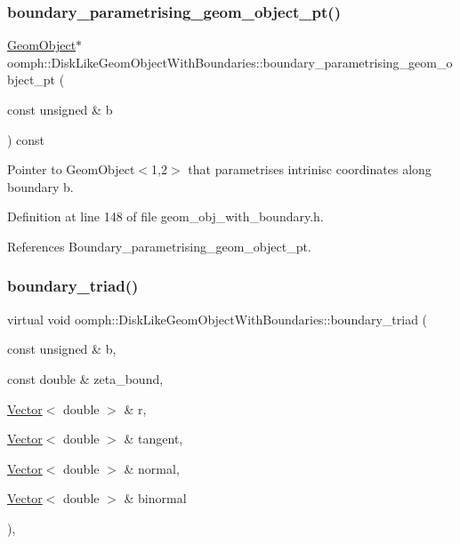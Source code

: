 \subsubsection{\texorpdfstring{boundary\+\_\+parametrising\+\_\+geom\+\_\+object\+\_\+pt()}{boundary\_parametrising\_geom\_object\_pt()}}
{\footnotesize\ttfamily \hyperlink{classoomph_1_1GeomObject}{Geom\+Object}$\ast$ oomph\+::\+Disk\+Like\+Geom\+Object\+With\+Boundaries\+::boundary\+\_\+parametrising\+\_\+geom\+\_\+object\+\_\+pt (\begin{DoxyParamCaption}\item[{const unsigned \&}]{b }\end{DoxyParamCaption}) const\hspace{0.3cm}{\ttfamily [inline]}}



Pointer to Geom\+Object$<$1,2$>$ that parametrises intrinisc coordinates along boundary b. 



Definition at line 148 of file geom\+\_\+obj\+\_\+with\+\_\+boundary.\+h.



References Boundary\+\_\+parametrising\+\_\+geom\+\_\+object\+\_\+pt.

\mbox{\label{classoomph_1_1DiskLikeGeomObjectWithBoundaries_aafe14f8fb055a10b33da4e730f457308}} 
\subsubsection{\texorpdfstring{boundary\+\_\+triad()}{boundary\_triad()}}
{\footnotesize\ttfamily virtual void oomph\+::\+Disk\+Like\+Geom\+Object\+With\+Boundaries\+::boundary\+\_\+triad (\begin{DoxyParamCaption}\item[{const unsigned \&}]{b,  }\item[{const double \&}]{zeta\+\_\+bound,  }\item[{\hyperlink{classoomph_1_1Vector}{Vector}$<$ double $>$ \&}]{r,  }\item[{\hyperlink{classoomph_1_1Vector}{Vector}$<$ double $>$ \&}]{tangent,  }\item[{\hyperlink{classoomph_1_1Vector}{Vector}$<$ double $>$ \&}]{normal,  }\item[{\hyperlink{classoomph_1_1Vector}{Vector}$<$ double $>$ \&}]{binormal }\end{DoxyParamCaption})\hspace{0.3cm}{\ttfamily [inline]}, {\ttfamily [virtual]}}



